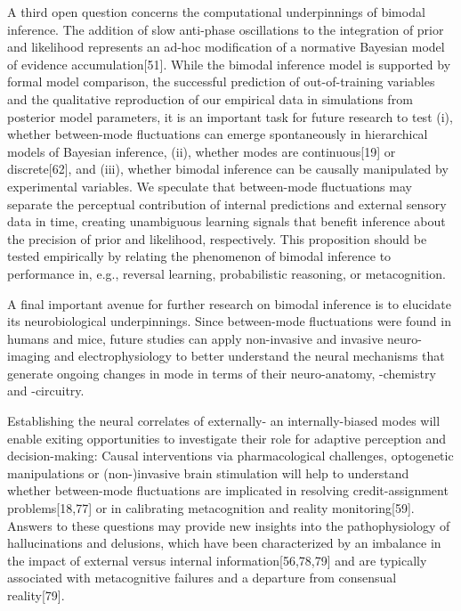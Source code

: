 \documentclass[
]{article}
\begin{document}
A third open question concerns the computational underpinnings of
bimodal inference. The addition of slow anti-phase oscillations to the
integration of prior and likelihood represents an ad-hoc modification of
a normative Bayesian model of evidence accumulation{[}51{]}. While the
bimodal inference model is supported by formal model comparison, the
successful prediction of out-of-training variables and the qualitative
reproduction of our empirical data in simulations from posterior model
parameters, it is an important task for future research to test (i),
whether between-mode fluctuations can emerge spontaneously in
hierarchical models of Bayesian inference, (ii), whether modes are
continuous{[}19{]} or discrete{[}62{]}, and (iii), whether bimodal
inference can be causally manipulated by experimental variables. We
speculate that between-mode fluctuations may separate the perceptual
contribution of internal predictions and external sensory data in time,
creating unambiguous learning signals that benefit inference about the
precision of prior and likelihood, respectively. This proposition should
be tested empirically by relating the phenomenon of bimodal inference to
performance in, e.g., reversal learning, probabilistic reasoning, or
metacognition.

A final important avenue for further research on bimodal inference is to
elucidate its neurobiological underpinnings. Since between-mode
fluctuations were found in humans and mice, future studies can apply
non-invasive and invasive neuro-imaging and electrophysiology to better
understand the neural mechanisms that generate ongoing changes in mode
in terms of their neuro-anatomy, -chemistry and -circuitry.

Establishing the neural correlates of externally- an internally-biased
modes will enable exiting opportunities to investigate their role for
adaptive perception and decision-making: Causal interventions via
pharmacological challenges, optogenetic manipulations or (non-)invasive
brain stimulation will help to understand whether between-mode
fluctuations are implicated in resolving credit-assignment
problems{[}18,77{]} or in calibrating metacognition and reality
monitoring{[}59{]}. Answers to these questions may provide new insights
into the pathophysiology of hallucinations and delusions, which have
been characterized by an imbalance in the impact of external versus
internal information{[}56,78,79{]} and are typically associated with
metacognitive failures and a departure from consensual reality{[}79{]}.
\end{document}
